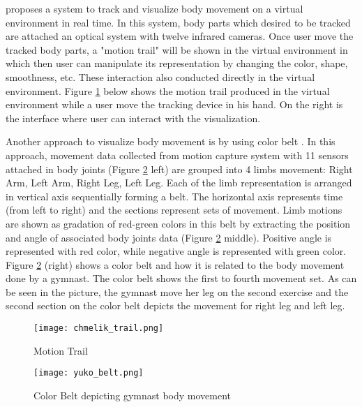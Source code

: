 \cite{chmelik} proposes a system to track and visualize body movement on a virtual environment in real time. In this system, body parts  which desired to be tracked are attached an optical system with twelve infrared cameras. Once user move the tracked body parts, a "motion trail" will be shown in the virtual environment in which then user can manipulate its representation by changing the color, shape, smoothness, etc. These interaction also conducted directly in the virtual environment. Figure \ref{motion_trail} \cite{chmelik} below shows the motion trail produced in the virtual environment while a user move the tracking device in his hand. On the right is the interface where user can interact with the visualization.

Another approach to visualize body movement is by using color belt \cite{yuko}. In this approach, movement data collected from motion capture system with 11 sensors attached in body joints (Figure \ref{color_belt} left) are grouped into 4 limbs movement: Right Arm, Left Arm, Right Leg, Left Leg. Each of the limb representation is arranged in vertical axis sequentially forming a belt. The horizontal axis represents time (from left to right) and the sections represent sets of movement. Limb motions are shown as gradation of red-green colors in this belt by extracting the position and angle of associated body joints data (Figure \ref{color_belt} middle). Positive angle is represented with red color, while negative angle is represented with green color. Figure \ref{color_belt} (right) shows a color belt and how it is related to the body movement done by a gymnast. The color belt shows the first to fourth movement set. As can be seen in the picture, the gymnast move her leg on the second exercise and the second section on the color belt depicts the movement for right leg and left leg.

\begin{figure}
\centering
\texttt{[image: chmelik\_trail.png]}
\caption{Motion Trail}
\label{motion_trail}
\end{figure}

\begin{figure}
\centering
\texttt{[image: yuko\_belt.png]}
\caption{Color Belt depicting gymnast body movement}
\label{color_belt}
\end{figure}


